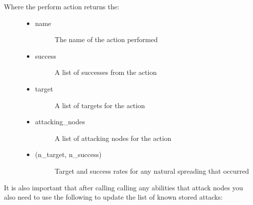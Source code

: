 \documentclass[letterpaper,10pt,english]{sphinxmanual}
\begin{document}
\begin{description}
\item[{Where the perform action returns the:}] \leavevmode\begin{itemize}
\item {} \begin{description}
\item[{name}] \leavevmode
\sphinxAtStartPar
The name of the action performed

\end{description}

\item {} \begin{description}
\item[{success}] \leavevmode
\sphinxAtStartPar
A list of successes from the action

\end{description}

\item {} \begin{description}
\item[{target}] \leavevmode
\sphinxAtStartPar
A list of targets for the action

\end{description}

\item {} \begin{description}
\item[{attacking\_nodes}] \leavevmode
\sphinxAtStartPar
A list of attacking nodes for the action

\end{description}

\item {} \begin{description}
\item[{(n\_target, n\_success)}] \leavevmode
\sphinxAtStartPar
Target and success rates for any natural spreading that occurred

\end{description}

\end{itemize}

\end{description}

\sphinxAtStartPar
It is also important that after calling calling any abilities that attack nodes you also need to use the following to update the list of known stored attacks:

\begin{sphinxVerbatim}[commandchars=\\\{\}]
  
\end{sphinxVerbatim}
\end{document}
